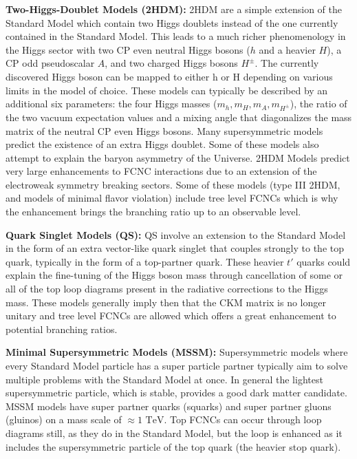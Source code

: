 \textbf{Two-Higgs-Doublet Models (2HDM): } 2HDM are a simple extension of the Standard Model which contain two Higgs doublets instead of the one currently contained in the Standard Model.  This leads to a much richer phenomenology in the Higgs sector with two CP even neutral Higgs bosons ($h$ and a heavier $H$), a CP odd pseudoscalar $A$, and two charged Higgs bosons $H^\pm$.  The currently discovered Higgs boson can be mapped to either h or H depending on various limits in the model of choice.  These models can typically be described by an additional six parameters: the four Higgs masses ($m_h, m_H,m_A,m_{H^\pm}$), the ratio of the two vacuum expectation values and a mixing angle that diagonalizes the mass matrix of the neutral CP even Higgs bosons.  Many supersymmetric models predict the existence of an extra Higgs doublet.  Some of these models also attempt to explain the baryon asymmetry of the Universe\cite{Trodden:1998ym}.
2HDM Models predict very large enhancements to FCNC interactions due to an extension of the electroweak symmetry breaking sectors.  Some of these models (type III 2HDM, and models of minimal flavor violation) include tree level FCNCs\cite{Branco:2011iw} which is why the enhancement brings the branching ratio up to an observable level.

\textbf{Quark Singlet Models (QS): } QS involve an extension to the Standard Model in the form of an extra vector-like quark singlet that couples strongly to the top quark, typically in the form of a top-partner quark.  These heavier $t'$ quarks could explain the fine-tuning of the Higgs boson mass through cancellation of some or all of the top loop diagrams present in the radiative corrections to the Higgs mass.  These models generally imply then that the CKM matrix is no longer unitary and tree level FCNCs are allowed which offers a great enhancement to potential branching ratios\cite{QS-1,QS-2}.

\textbf{Minimal Supersymmetric Models (MSSM): }  Supersymmetric models where every Standard Model particle has a super particle partner typically aim to solve multiple problems with the Standard Model at once.  In general the lightest supersymmetric particle, which is stable, provides a good dark matter candidate.  MSSM models have super partner quarks (squarks) and super partner gluons (gluinos) on a mass scale of $\approx 1 \text{ TeV}$.  Top FCNCs can occur through loop diagrams still, as they do in the Standard Model, but the loop is enhanced as it includes the supersymmetric particle of the top quark (the heavier stop quark)\cite{MSSM, MSSM-2}.

